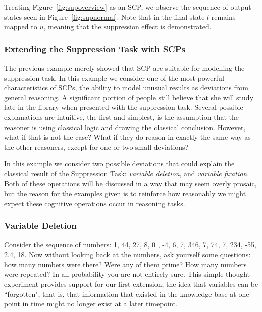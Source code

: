 \documentclass{article}
\begin{document}
Treating Figure~\ref{fig:supoverview} as an SCP, we observe the sequence of output states seen in Figure~\ref{fig:supnormal}. Note that in the final state $l$ remains mapped to $u$, meaning that the suppression effect is demonstrated.

\subsubsection{Extending the Suppression Task with SCPs}
The previous example merely showed that SCP are suitable for modelling the suppression task. In this example we consider one of the most powerful characteristics of SCPs, the ability to model unusual results as deviations from general reasoning. A significant portion of people still believe that she will study late in the library when presented with the suppression task. Several possible explanations are intuitive, the first and simplest, is the assumption that the reasoner is using classical logic and drawing the classical conclusion. However, what if that is not the case? What if they do reason in exactly the same way as the other reasoners, except for one or two small deviations?

In this example we consider two possible deviations that could explain the classical result of the Suppression Task: \textit{variable deletion}, and\textit{ variable fixation}. Both of these operations will be discussed in a way that may seem overly prosaic, but the reason for the examples given is to reinforce how reasonably we might expect these cognitive operations occur in reasoning tasks.

\subsubsection*{Variable Deletion} \label{ssec:variableDeletion}

Consider the sequence of numbers: 1, 44, 27, 8, 0 , -4, 6, 7, 346, 7, 74, 7, 234, -55, 2.4, 18. Now without looking back at the numbers, ask yourself some questions: how many numbers were there? Were any of them prime? How many numbers were repeated? In all probability you are not entirely sure. This simple thought experiment provides support for our first extension, the idea that variables can be ``forgotten", that is, that information that existed in the knowledge base at one point in time might no longer exist at a later timepoint. 
\end{document}
